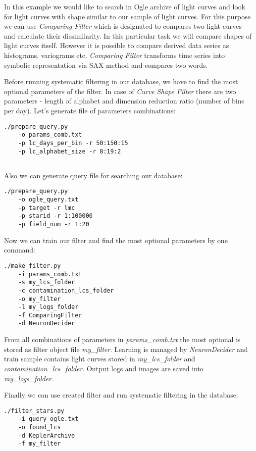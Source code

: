 \documentclass[final,5p,times,twocolumn,authoryear]{elsarticle}
\begin{document}
In this example we would like to search in  Ogle archive of light curves \cite{ogleII} and look for light curves with shape similar to our sample of light curves. For this purpose we can use \textit{Comparing Filter} which is designated to compares two light curves and calculate their dissimilarity. In this particular task we will compare shapes of light curves itself. However it is possible to compare derived data series as histograms, variograms etc.  \textit{Comparing Filter} transforms time series into symbolic representation via SAX method \cite{sax} and compares two words. 

Before running systematic filtering in our database, we have to find the most optional parameters of the filter. In case of \textit{Curve Shape Filter} there are two parameters - length of alphabet and dimension reduction ratio (number of bins per day). Let's generate file of parameters combinations:

\begin{lstlisting}
./prepare_query.py
	-o params_comb.txt
	-p lc_days_per_bin -r 50:150:15	
	-p lc_alphabet_size -r 8:19:2 
	
\end{lstlisting}
%
Also we can generate query file for searching our database:

\begin{lstlisting}
./prepare_query.py
	-o ogle_query.txt
	-p target -r lmc
	-p starid -r 1:100000
	-p field_num -r 1:20
\end{lstlisting}
%
Now we can train our filter and find the most optional parameters by one command:

\begin{lstlisting}
./make_filter.py
	-i params_comb.txt	
	-s my_lcs_folder
	-c contamination_lcs_folder
	-o my_filter
	-l my_logs_folder
	-f ComparingFilter
	-d NeuronDecider	
\end{lstlisting}

From all combinations of parameters in \textit{params\_comb.txt} the most optional is stored as filter object file \textit{my\_filter}. Learning is managed by \textit{NeuronDecider} and train sample contains light curves stored in \textit{my\_lcs\_folder} and \textit{contamination\_lcs\_folder}. Output logs and images are saved into \textit{my\_logs\_folder}. 

Finally we can use created filter and run systematic filtering in the database:

\begin{lstlisting}
./filter_stars.py
	-i query_ogle.txt
	-o found_lcs
	-d KeplerArchive
	-f my_filter	
\end{lstlisting}
\end{document}
